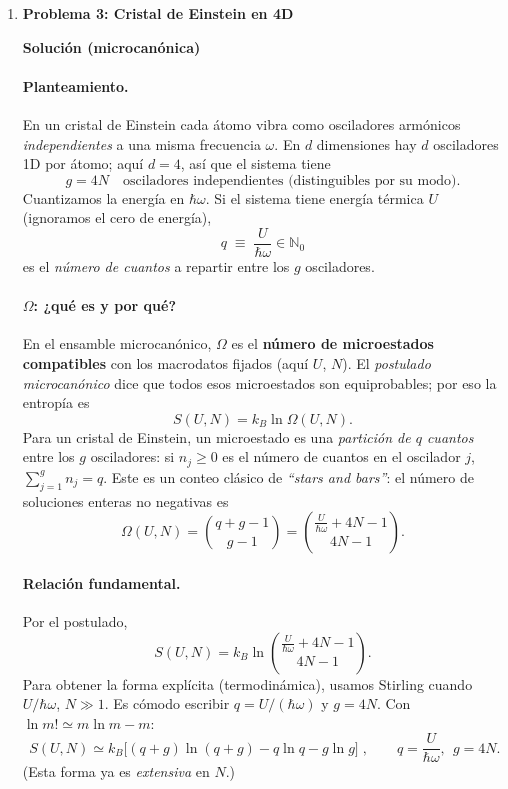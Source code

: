 \documentclass{article}
\begin{document}
\begin{enumerate}[label={{\textcolor{trueblue}{\textbf{Ej}. \arabic*.0}}}, start=3]
\item \textbf{Problema 3: Cristal de Einstein en 4D}

\textcolor{Cinnabar}{\textbf{Solución (microcanónica)}}

\paragraph{Planteamiento.}
En un cristal de Einstein cada átomo vibra como osciladores armónicos \emph{independientes} a una misma frecuencia \(\omega\).
En \(d\) dimensiones hay \(d\) osciladores 1D por átomo; aquí \(d=4\), así que el sistema tiene
\[
g=4N \quad\text{osciladores independientes (distinguibles por su modo).}
\]
Cuantizamos la energía en \(\hbar\omega\). Si el sistema tiene energía térmica \(U\) (ignoramos el cero de energía),
\[
q\;\equiv\;\frac{U}{\hbar\omega}\in\mathbb{N}_0
\]
es el \emph{número de cuantos} a repartir entre los \(g\) osciladores.

\paragraph{\(\Omega\): ¿qué es y por qué?}
En el ensamble microcanónico, \(\Omega\) es el \textbf{número de microestados compatibles} con los macrodatos fijados (aquí \(U\), \(N\)).
El \emph{postulado microcanónico} dice que todos esos microestados son equiprobables; por eso la entropía es
\[
S(U,N)=k_B\ln\Omega(U,N).
\]
Para un cristal de Einstein, un microestado es una \emph{partición de \(q\) cuantos} entre los \(g\) osciladores: si \(n_j\ge 0\) es el número de cuantos en el oscilador \(j\),
\(
\sum_{j=1}^{g} n_j = q
\).
Este es un conteo clásico de \emph{“stars and bars”}: el número de soluciones enteras no negativas es
\[
\Omega(U,N)=\binom{q+g-1}{g-1}=\binom{\frac{U}{\hbar\omega}+4N-1}{4N-1}.
\]

\paragraph{Relación fundamental.}
Por el postulado,
\[
S(U,N)=k_B\ln\binom{\frac{U}{\hbar\omega}+4N-1}{4N-1}.
\]
Para obtener la forma explícita (termodinámica), usamos Stirling cuando \(U/\hbar\omega\), \(N\gg 1\).
Es cómodo escribir \(q=U/(\hbar\omega)\) y \(g=4N\). Con \(\ln m!\simeq m\ln m-m\):
\[
\boxed{\;
S(U,N)\simeq k_B\Big[(q+g)\ln(q+g)-q\ln q-g\ln g\Big]
\;},\qquad q=\frac{U}{\hbar\omega},\ \ g=4N.
\]
(Esta forma ya es \emph{extensiva} en \(N\).)


\end{enumerate}
\end{document}
